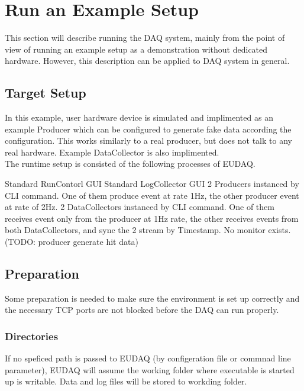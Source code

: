 \section{Run an Example Setup}
This section will describe running the DAQ system, mainly from the point of view of running an example setup as a demonstration without dedicated hardware.
However, this description can be applied to DAQ system in general.

\subsection{Target Setup}
In this example, user hardware device is simulated and implimented as an example Producer which can be configured to generate fake data according the configuration. This works similarly to a real producer, but does not talk to any real hardware. Example DataCollector is also implimented. \\
The runtime setup is consisted of the following processes of EUDAQ.
\begin{description}
Standard RunContorl GUI
Standard LogCollector GUI
2 Producers instanced by CLI command. One of them produce event at rate 1Hz, the other producer event at rate of 2Hz.
2 DataCollectors instanced by CLI command. One of them receives event only from the producer at 1Hz rate, the other receives events from both DataCollectors, and sync the 2 stream by Timestamp.
No monitor exists. (TODO: producer generate hit data)
\end{description}

\subsection{Preparation}
Some preparation is needed to make sure the environment is set up correctly and
the necessary TCP ports are not blocked before the DAQ can run properly.

\subsubsection{Directories}
If no speficed path is passed to EUDAQ (by configeration file or commnad line parameter), EUDAQ will assume the working folder where executable is started up  is writable. Data and log files will be stored to workding folder.

